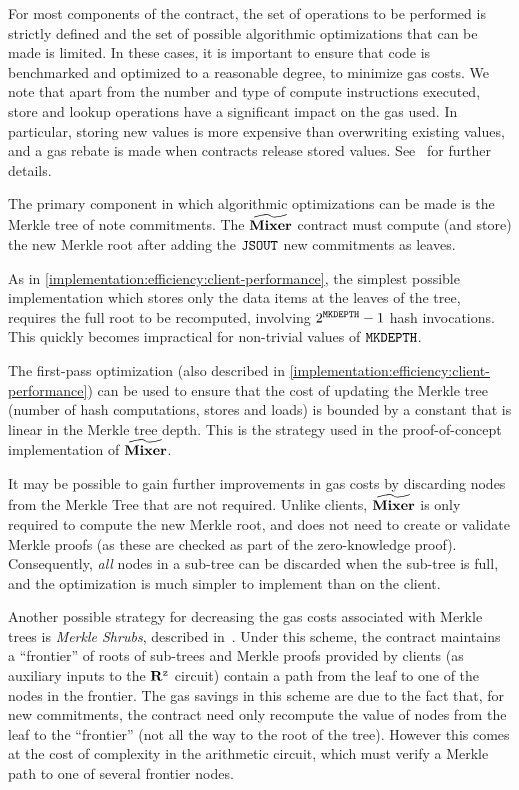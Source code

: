For most components of the contract, the set of operations to be performed is strictly defined and the set of possible algorithmic optimizations that can be made is limited. In these cases, it is important to ensure that code is benchmarked and optimized to a reasonable degree, to minimize gas costs. We note that apart from the number and type of compute instructions executed, store and lookup operations have a significant impact on the gas used. In particular, storing new values is more expensive than overwriting existing values, and a gas rebate is made when contracts release stored values. See~\cite[Appendix H.1]{ethyellowpaper} for further details.

The primary component in which algorithmic optimizations can be made is the Merkle tree of note commitments. The $\widetilde{\mathbf{Mixer}}$ contract must compute (and store) the new Merkle root after adding the $\mathtt{JSOUT}$ new commitments as leaves.

As in \cref{implementation:efficiency:client-performance}, the simplest possible implementation which stores only the data items at the leaves of the tree, requires the full root to be recomputed, involving $2^{\mathtt{MKDEPTH}} - 1$ hash invocations. This quickly becomes impractical for non-trivial values of $\mathtt{MKDEPTH}$.

The first-pass optimization (also described in \cref{implementation:efficiency:client-performance}) can be used to ensure that the cost of updating the Merkle tree (number of hash computations, stores and loads) is bounded by a constant that is linear in the Merkle tree depth. This is the strategy used in the proof-of-concept implementation of $\widetilde{\mathbf{Mixer}}$.

It may be possible to gain further improvements in gas costs by discarding nodes from the Merkle Tree that are not required. Unlike clients, $\widetilde{\mathbf{Mixer}}$ is only required to compute the new Merkle root, and does not need to create or validate Merkle proofs (as these are checked as part of the zero-knowledge proof). Consequently, \emph{all} nodes in a sub-tree can be discarded when the sub-tree is full, and the optimization is much simpler to implement than on the client.

Another possible strategy for decreasing the gas costs associated with Merkle trees is \emph{Merkle Shrubs}, described in~\cite[Section 2.2]{merkle-shrubs}. Under this scheme, the contract maintains a ``frontier'' of roots of sub-trees and Merkle proofs provided by clients (as auxiliary inputs to the $\mathbf{R}^{\texttt{z}}$ circuit) contain a path from the leaf to one of the nodes in the frontier. The gas savings in this scheme are due to the fact that, for new commitments, the contract need only recompute the value of nodes from the leaf to the ``frontier'' (not all the way to the root of the tree). However this comes at the cost of complexity in the arithmetic circuit, which must verify a Merkle path to one of several frontier nodes.

